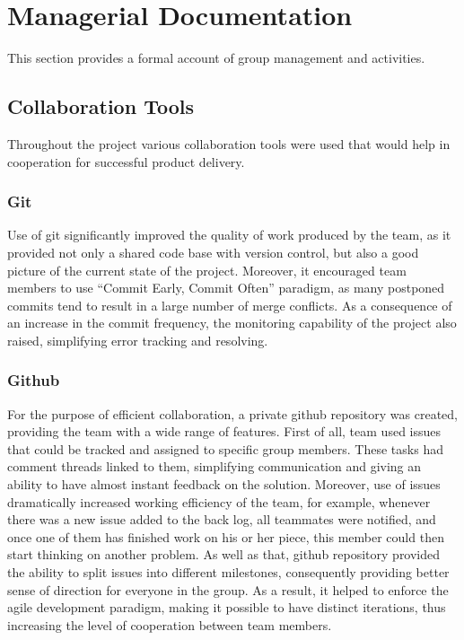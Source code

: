 \documentclass[10pt]{article}
\begin{document}
\section{Managerial Documentation}
\label{sec-group}

This section provides a formal account of group management and activities.

\subsection{Collaboration Tools}

Throughout the project various collaboration tools were used that would help in cooperation for successful product delivery.

\subsubsection{Git}

Use of git significantly improved the quality of work produced by the team, as it provided not only a shared code base with version control, but also a good picture of the current state of the project. Moreover, it encouraged team members to use ``Commit Early, Commit Often'' paradigm, as many postponed commits tend to result in a large number of merge conflicts. As a consequence of an increase in the commit frequency, the monitoring capability of the project also raised, simplifying error tracking and resolving.

\subsubsection{Github}

For the purpose of efficient collaboration, a private github repository was created, providing the team with a wide range of features. First of all, team used issues that could be tracked and assigned to specific group members. These tasks had comment threads linked to them, simplifying communication and giving an ability to have almost instant feedback on the solution. Moreover, use of issues dramatically increased working efficiency of the team, for example, whenever there was a new issue added to the back log, all teammates were notified, and once one of them has finished work on his or her piece, this member could then start thinking on another problem. As well as that, github repository provided the ability to split issues into different milestones, consequently providing better sense of direction for everyone in the group. As a result, it helped to enforce the agile development paradigm, making it possible to have distinct iterations, thus increasing the level of cooperation between team members.
\end{document}
